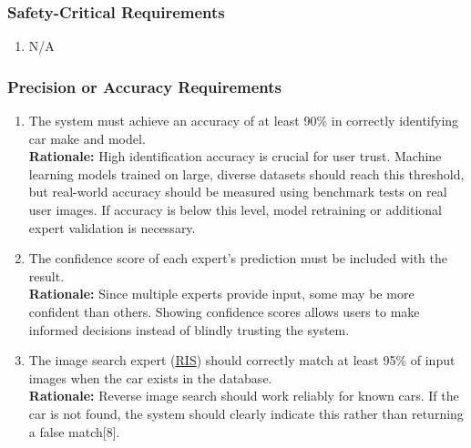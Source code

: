 \documentclass[]{article}
\begin{document}
\subsubsection{Safety-Critical Requirements}
\label{ssub:safety_critical_requirements}
\begin{enumerate}[label={PR-SC\arabic*.}]
    \item N/A
\end{enumerate}

\subsubsection{Precision or Accuracy Requirements}
\label{ssub:precision_or_accuracy_requirements}
\begin{enumerate}[label={PR-PA\arabic*.}]
    \item The system must achieve an accuracy of at least 90\% in correctly identifying car make and model.\\
	\textbf{Rationale:} High identification accuracy is crucial for user trust. Machine learning models trained on large, diverse datasets should reach this threshold, but real-world accuracy should be measured using benchmark tests on real user images. If accuracy is below this level, model retraining or additional expert validation is necessary.
	\item The confidence score of each expert’s prediction must be included with the result.\\
	\textbf{Rationale:} Since multiple experts provide input, some may be more confident than others. Showing confidence scores allows users to make informed decisions instead of blindly trusting the system.
	\item The image search expert (\underline{RIS}) should correctly match at least 95\% of input images when the car exists in the database.\\
	\textbf{Rationale:} Reverse image search should work reliably for known cars. If the car is not found, the system should clearly indicate this rather than returning a false match[8].
\end{enumerate}
\end{document}

